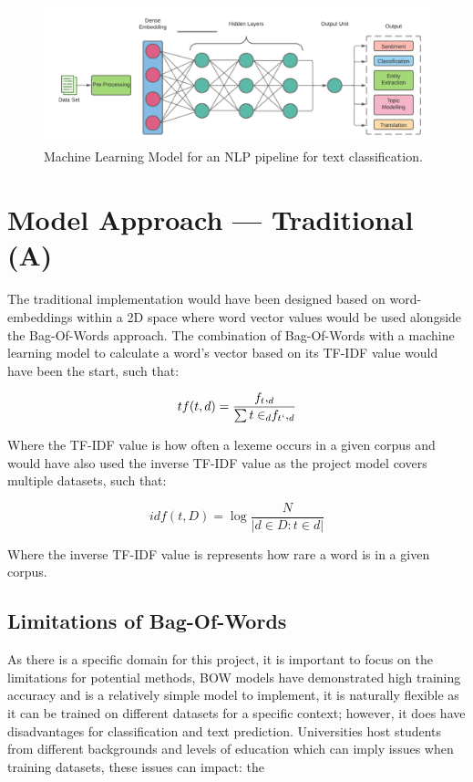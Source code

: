 \begin{figure}[H]
    \centering
    \includegraphics[width=\textwidth]{figures/chapter-5/MLNLP.pdf}
    \caption[MachineLearningNLP]{Machine Learning Model for an NLP pipeline for text classification.
    \label{fig:MLNLP}}
\end{figure}

\section{Model Approach --- Traditional (A)} \label{sub:C5ModelATraditionalA}

The traditional implementation would have been designed based on word-embeddings within a 2D space where word vector values would be used alongside the Bag-Of-Words approach. The combination of Bag-Of-Words with a machine learning model to calculate a word’s vector based on its TF-IDF value would have been the start, such that:

\begin{equation}
    tf(t,d) = \frac{f_t, _d}{\sum{t \in_d} f _t {_`}, _d}
\end{equation}

Where the TF-IDF value is how often a lexeme occurs in a given corpus and would have also used the inverse TF-IDF value as the project model covers multiple datasets, such that:

\begin{equation}
    idf(t, D) = \log \frac{N}{|d \in D : t \in d|}
\end{equation}

Where the inverse TF-IDF value is represents how rare a word is in a given corpus.

\subsection{Limitations of Bag-Of-Words}

As there is a specific domain for this project, it is important to focus on the limitations for potential methods, BOW models have demonstrated high training accuracy and is a relatively simple model to implement, it is naturally flexible as it can be trained on different datasets for a specific context; however, it does have disadvantages for classification and text prediction. Universities host students from different backgrounds and levels of education which can imply issues when training datasets, these issues can impact: the

